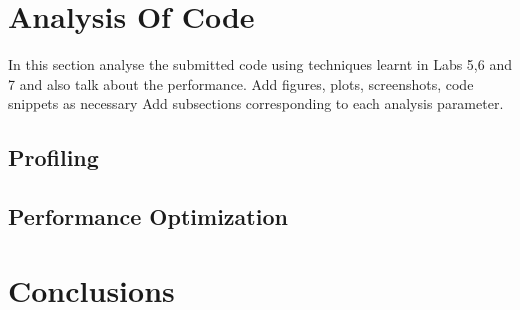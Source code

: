 \documentclass[english, 11pt]{article}
\begin{document}
\section{Analysis Of Code}
In this section analyse the submitted code using techniques learnt in Labs 5,6 and 7 and also talk about the performance. Add figures, plots, screenshots, code snippets as necessary
Add subsections corresponding to each analysis parameter.

\subsection{Profiling}
\subsection{Performance Optimization}

\section{Conclusions}



\end{document}
